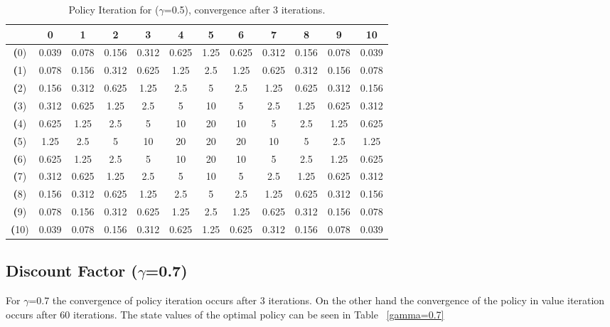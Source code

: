 \documentclass[11pt]{article}
\begin{document}
\begin{center}
\begin{table}[ht]
{\small
\hfill{}
\begin{tabular}{c|c|c|c|c|c|c|c|c|c|c|c}
\textbf{} & \textbf{0} & \textbf{1} & \textbf{2} & \textbf{3} & \textbf{4} & \textbf{5} & \textbf{6} & \textbf{7} & \textbf{8} & \textbf{9} & \textbf{10}\\
	\hline

\textbf(0)& 0.039	& 0.078	& 0.156	& 0.312	& 0.625	& 1.25	& 0.625	& 0.312	& 0.156	& 0.078	& 0.039	\\
\textbf(1)& 0.078	& 0.156	& 0.312	& 0.625	& 1.25	& 2.5	& 1.25	& 0.625	& 0.312	& 0.156	& 0.078	\\
\textbf(2)& 0.156	& 0.312	& 0.625	& 1.25	& 2.5	& 5	& 2.5	& 1.25	& 0.625	& 0.312	& 0.156	\\
\textbf(3)& 0.312	& 0.625	& 1.25	& 2.5	& 5	& 10	& 5	& 2.5	& 1.25	& 0.625	& 0.312	\\
\textbf(4)& 0.625	& 1.25	& 2.5	& 5	& 10	& 20	& 10	& 5	& 2.5	& 1.25	& 0.625	\\
\textbf(5)& 1.25	& 2.5	& 5	& 10	& 20	& 20	& 20	& 10	& 5	& 2.5	& 1.25	\\
\textbf(6)& 0.625	& 1.25	& 2.5	& 5	& 10	& 20	& 10	& 5	& 2.5	& 1.25	& 0.625	\\
\textbf(7)& 0.312	& 0.625	& 1.25	& 2.5	& 5	& 10	& 5	& 2.5	& 1.25	& 0.625	& 0.312	\\
\textbf(8)& 0.156	& 0.312	& 0.625	& 1.25	& 2.5	& 5	& 2.5	& 1.25	& 0.625	& 0.312	& 0.156	\\
\textbf(9)& 0.078	& 0.156	& 0.312	& 0.625	& 1.25	& 2.5	& 1.25	& 0.625	& 0.312	& 0.156	& 0.078	\\
\textbf(10)& 0.039	& 0.078	& 0.156	& 0.312	& 0.625	& 1.25	& 0.625	& 0.312	& 0.156	& 0.078	& 0.039	\\

\end{tabular}}
\hfill{}
\caption{Policy Iteration for ($\gamma$=0.5), convergence after 3 iterations.}
\label{gamma=0.5}
\end{table}
\end{center}


\subsection{Discount Factor ($\gamma$=0.7)}

For $\gamma$=0.7 the convergence of policy iteration occurs after 3 iterations. On the other hand the convergence of the policy in value iteration occurs after 60 iterations. The state values of the optimal policy can be seen in Table ~\ref{gamma=0.7}
\end{document}
